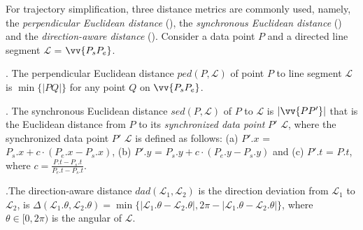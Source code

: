  For trajectory simplification, three distance metrics are commonly used, namely, the \emph{perpendicular Euclidean distance} (\ped), the \emph{synchronous Euclidean distance} \cite{Meratnia:Spatiotemporal} (\sed) and the \emph{direction-aware distance}\cite{Long:Direction, Zhang:Evaluation} (\dad).
%
Consider a data point $P$ and a directed line segment $\mathcal{L}$ = $\vv{P_{s}P_{e}}$.

. The perpendicular Euclidean distance $ped(P, \mathcal{L})$ of point $P$ to line segment $\mathcal{L}$ is $\min\{|PQ|\}$ for any point $Q$ on $\vv{P_{s}P_{e}}$.

. The synchronous Euclidean distance $sed(P, \mathcal{L})$ of $P$ to $\mathcal{L}$ is $|\vv{PP'}|$ that is the Euclidean distance from $P$ to its \textit{synchronized data point} $P'$ \wrt $\mathcal{L}$, where the synchronized data point $P'$ \wrt $\mathcal{L}$ is defined as follows:
(a) $P'.x$ = $P_s.x +  c\cdot(P_e.x - P_s.x)$,
(b) $P'.y$ = $P_s.y +  c\cdot(P_e.y - P_s.y)$ and
(c) $P'.t$ = $P.t$, where $c= \frac{P.t-P_s.t}{P_e.t-P_s.t}$.


.The direction-aware distance $dad(\mathcal{L}_1, \mathcal{L}_2)$ is the direction deviation from $\mathcal{L}_1$ to $\mathcal{L}_2$, is $\Delta(\mathcal{L}_1.\theta, \mathcal{L}_2.\theta) = \min\{|\mathcal{L}_1.\theta - \mathcal{L}_2.\theta|, 2\pi - |\mathcal{L}_1.\theta - \mathcal{L}_2.\theta|\}$, where $\theta \in [0, 2\pi)$ is the angular of $\mathcal{L}$.






